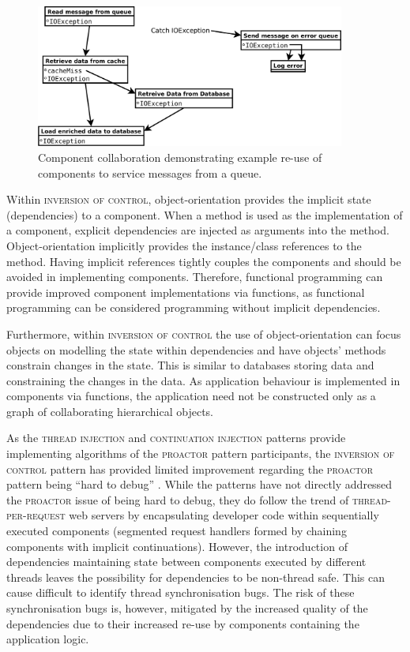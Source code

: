 \documentclass[prodmode]{style/acmlarge}
\begin{document}
\begin{figure}[t]
\centering
\includegraphics[width=4in]{IocReuseForQueue}
\caption{Component collaboration demonstrating example re-use of components to service messages from a queue.}
\label{fig:IocReuseForQueue}
\end{figure}

Within \textsc{inversion of control}, object-orientation provides the implicit
state (dependencies) to a component.  When a method is used as the
implementation of a component, explicit dependencies are injected as arguments
into the method.  Object-orientation implicitly provides the instance/class
references to the method.  Having implicit references tightly couples the
components and should be avoided in implementing components.  Therefore,
functional programming can provide improved component implementations via
functions, as functional programming can be considered programming without
implicit dependencies.

Furthermore, within \textsc{inversion of control} the use of object-orientation
can focus objects on modelling the state within dependencies and have objects'
methods constrain changes in the state.  This is similar to databases storing
data and constraining the changes in the data.  As application behaviour is
implemented in components via functions, the application need not be constructed
only as a graph of collaborating hierarchical objects.

As the \textsc{thread injection} and \textsc{continuation injection} patterns
provide implementing algorithms of the \textsc{proactor} pattern participants,
the \textsc{inversion of control} pattern has provided limited improvement
regarding the \textsc{proactor} pattern being ``hard to debug'' \cite[p.
7]{proactor}.  While the patterns have not directly addressed the
\textsc{proactor} issue of being hard to debug, they do follow the trend of
\textsc{thread-per-request} web servers \cite{thread-per-request} by
encapsulating developer code within sequentially executed components (segmented
request handlers formed by chaining components with implicit continuations).
However, the introduction of dependencies maintaining state between components
executed by different threads leaves the possibility for dependencies to be
non-thread safe.  This can cause difficult to identify thread synchronisation
bugs.  The risk of these synchronisation bugs is, however, mitigated by the
increased quality of the dependencies due to their increased re-use by
components containing the application logic.
\end{document}

